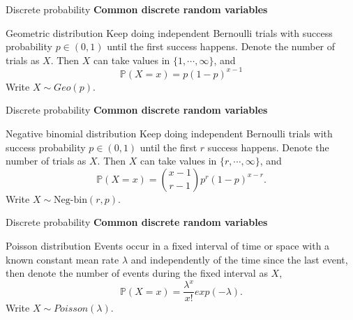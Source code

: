 \documentclass [aspectratio=169]{beamer}
\begin{document}
\begin{frame}{Discrete probability}
\textbf{Common discrete random variables}
\begin{block}{Geometric distribution}
Keep doing independent Bernoulli trials with success probability $p \in (0,1)$ until the first success happens. Denote the number of trials as $X$. Then $X$ can take values in $\{1, \cdots, \infty\}$, and
$$
\mathbb{P}(X = x) = p(1-p)^{x-1}
$$
Write $X \sim Geo(p)$.
\end{block}
\vspace{0.1in}
\end{frame}


\begin{frame}{Discrete probability}
\textbf{Common discrete random variables}
\begin{block}{Negative binomial distribution}
Keep doing independent Bernoulli trials with success probability $p \in (0,1)$ until the first $r$ success happens. Denote the number of trials as $X$. Then $X$ can take values in $\{r, \cdots, \infty\}$, and
$$
\mathbb{P}(X = x) = \binom{x-1}{r-1}p^{r}(1-p)^{x-r}.
$$
Write $X \sim \text{Neg-bin}(r,p)$.
\end{block}
\vspace{0.1in}
\end{frame}


\begin{frame}{Discrete probability}
\textbf{Common discrete random variables}
\begin{block}{Poisson distribution}
Events occur in a fixed interval of time or space with a known constant mean rate $\lambda$ and independently of the time since the last event, then denote the number of events during the fixed interval as $X$, 
$$
\mathbb{P}(X = x) = \dfrac{\lambda^x}{x!}exp(-\lambda).
$$
Write $X \sim Poisson(\lambda)$.
\end{block}
\vspace{0.1in}
\end{frame}
\end{document}
